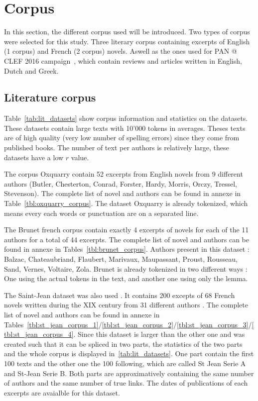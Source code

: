 \section{Corpus \label{sec:corpus}}

In this section, the different corpus used will be introduced.
Two types of corpus were selected for this study.
Three literary corpus containing excerpts of English (1 corpus) and French (2 corpus) novels.
Aswell as the ones used for PAN @ CLEF 2016 campaign~\cite{pan16}, which contain reviews and articles written in English, Dutch and Greek.

\subsection{Literature corpus}
\label{sec:lit_corpus}

Table~\ref{tab:lit_datasets} show corpus information and statistics on the datasets.
These datasets contain large texts with 10'000 tokens in averages.
Theses texts are of high quality (very low number of spelling errors) since they come from published books.
The number of text per authors is relatively large, these datasets have a low $r$ value.

The corpus Oxquarry contain 52 excerpts from English novels from 9 different authors (Butler, Chesterton, Conrad, Forster, Hardy, Morris, Orczy, Tressel, Stevenson).
The complete list of novel and authors can be found in annexe in Table~\ref{tbl:oxquarry_corpus}.
The dataset Oxquarry is already tokenized, which means every each words or punctuation are on a separated line.

The Brunet french corpus contain exactly 4 excerpts of novels for each of the 11 authors for a total of 44 excerpts.
The complete list of novel and authors can be found in annexe in Tables~\ref{tbl:brunet_corpus}.
Authors present in this dataset : Balzac, Chateaubriand, Flaubert, Marivaux, Maupassant, Proust, Rousseau, Sand, Vernes, Voltaire, Zola.
Brunet is already tokenized in two different ways : One using the actual tokens in the text, and another one using only the lemma.

The Saint-Jean dataset was also used \cite{unine_corpus}.
It contains 200 excepts of 68 French novels written during the XIX century from 31 different authors \cite{st_jean}.
The complete list of novel and authors can be found in annexe in Tables~\ref{tbl:st_jean_corpus_1}/\ref{tbl:st_jean_corpus_2}/\ref{tbl:st_jean_corpus_3}/\ref{tbl:st_jean_corpus_4}.
Since this dataset is larger than the other one and was created such that it can be spliced in two parts, the statistics of the two parts and the whole corpus is displayed in~\ref{tab:lit_datasets}.
One part contain the first 100 texts and the other one the 100 following, which are called St Jean Serie A and St-Jean Serie B.
Both parts are approximatively containing the same number of authors and the same number of true links.
The dates of publications of each excerpts are avaialble for this dataset.

